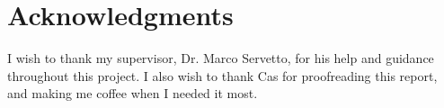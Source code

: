 \chapter*{Acknowledgments}\label{C:ack} 

I wish to thank my supervisor, Dr. Marco Servetto, for his help and guidance throughout this project. I also wish to thank Cas for proofreading this report, and making me coffee when I needed it most.